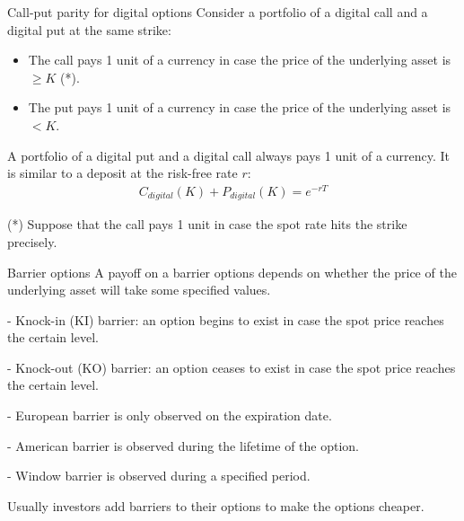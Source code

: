 \documentclass{beamer}
\begin{document}
\begin{frame}{Call-put parity for digital options}
\justify
Consider a portfolio of a digital call and a digital put at the same strike:

\justify
\begin{itemize}
\justifying
\item The call pays 1 unit of a currency in case the price of the underlying asset is $\ge K$ (*).
\item The put pays 1 unit of a currency in case the price of the underlying asset is $< K$.
\end{itemize}

\justify
A portfolio of a digital put and a digital call always pays 1 unit of a currency. It is similar to a deposit at the risk-free rate $r$:
\begin{align*}
C_{digital}(K) + P_{digital}(K) = e^{-rT}
\end{align*}

\justify
(*) Suppose that the call pays 1 unit in case the spot rate hits the strike precisely.
\end{frame}



\begin{frame}{Barrier options}
\justify
A payoff on a \alert{barrier options} depends on whether the price of the underlying asset will take some specified values.

\justify
- \alert{Knock-in (KI)} barrier: an option begins to exist in case the spot price reaches the certain level.

- \alert{Knock-out (KO)} barrier: an option ceases to exist in case the spot price reaches the certain level.

\justify
- European barrier is only observed on the expiration date.

- American barrier is observed during the lifetime of the option.

- Window barrier is observed during a specified period.

\justify
Usually investors add barriers to their options to make the options cheaper.
\end{frame}
\end{document}
